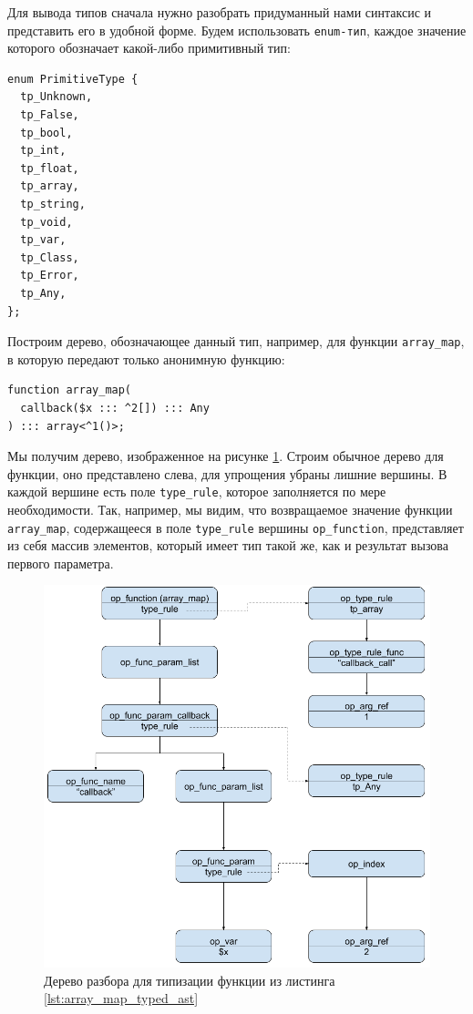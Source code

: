Для вывода типов сначала нужно разобрать придуманный нами синтаксис и представить его в удобной форме.
Будем использовать \verb|enum-тип|, каждое значение которого обозначает какой-либо примитивный тип:
\begin{lstlisting}
enum PrimitiveType {
  tp_Unknown,
  tp_False,
  tp_bool,
  tp_int,
  tp_float,
  tp_array,
  tp_string,
  tp_void,
  tp_var,
  tp_Class,
  tp_Error,
  tp_Any,
};
\end{lstlisting}

Построим дерево, обозначающее данный тип, например, для функции \verb|array_map|, в которую передают только анонимную функцию:
\begin{lstlisting}[label={lst:array_map_typed_ast}]
function array_map(
  callback($x ::: ^2[]) ::: Any
) ::: array<^1()>;
\end{lstlisting}
Мы получим дерево, изображенное на рисунке \ref{fig:ast_for_callback}.
Строим обычное дерево для функции, оно представлено слева, для упрощения убраны лишние вершины.
В каждой вершине есть поле \verb|type_rule|, которое заполняется по мере необходимости.
Так, например, мы видим, что возвращаемое значение функции \verb|array_map|, содержащееся в поле \verb|type_rule| вершины \verb|op_function|, представляет из себя массив элементов, который имеет тип такой же, как и результат вызова первого параметра.
\begin{figure}[H]
    \caption{Дерево разбора для типизации функции из листинга \ref{lst:array_map_typed_ast}}
    \label{fig:ast_for_callback}
    \centering
    \includegraphics[width=\linewidth]{images/ast_for_callback}
\end{figure}

